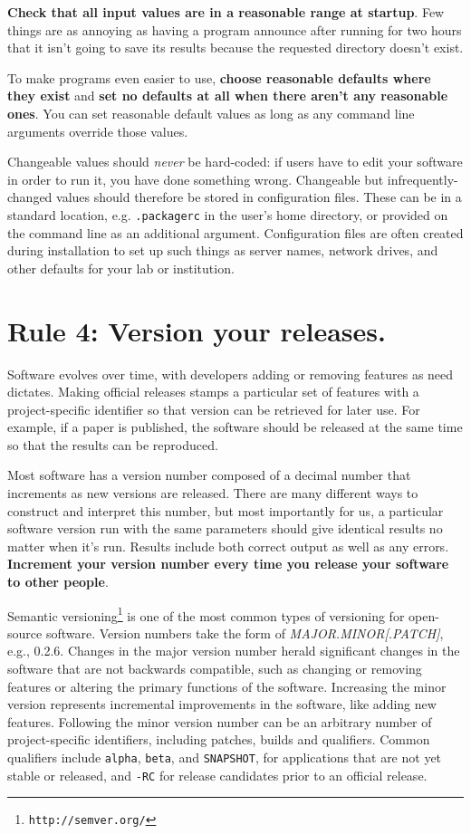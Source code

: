 \documentclass[10pt,letterpaper]{article}
\newcommand{\withurl}[2]{{#1}\footnote{\texttt{#2}}}
\newcommand{\rulemajor}[1]{\section{#1}}
\newcommand{\ruleminor}[1]{\textbf{#1}}
\begin{document}
\ruleminor{Check that all input values are in a reasonable range at startup}.
Few things are as annoying as having a program announce after running for two
hours that it isn't going to save its results because the requested directory
doesn't exist.

To make programs even easier to use,
\ruleminor{choose reasonable defaults where they exist}
and \ruleminor{set no defaults at all when there aren't any reasonable ones}.
You can set reasonable default values
as long as any command line arguments
override those values.

Changeable values should \emph{never} be hard-coded:
if users have to edit your software in order to run it,
you have done something wrong.
Changeable but infrequently-changed values should therefore be stored in configuration files.
These can be in a standard location,
e.g. \texttt{.packagerc} in the user's home directory,
or provided on the command line as an additional argument.
Configuration files are often created during installation
to set up such things as server names,
network drives,
and other defaults for your lab or institution.

\rulemajor{Rule 4: Version your releases.}

Software evolves over time, with developers adding or removing features as need
dictates. Making official releases stamps a particular set of features with a
project-specific identifier so that version can be retrieved for later use. For
example, if a paper is published, the software should be released at the same
time so that the results can be reproduced.

Most software has a version number composed of a decimal number that
increments as new versions are released.
There are many different ways
to construct and interpret this number, but most importantly for us, a
particular software version run with the same parameters should give
identical results no matter when it's run. Results include both correct
output as well as any errors.
\ruleminor{Increment your version number every time you release your software to
other people}.

\withurl{Semantic versioning}{http://semver.org/} is one of the most common
types of versioning for open-source software. Version numbers take the
form of \emph{MAJOR.MINOR{[}.PATCH{]}}, e.g., 0.2.6.
Changes in the major
version number herald significant changes in the software that are not
backwards compatible, such as changing or removing features or altering
the primary functions of the software. Increasing the minor version
represents incremental improvements in the software, like adding new
features. Following the minor version number can be an arbitrary number
of project-specific identifiers, including patches, builds and qualifiers.
Common qualifiers include \texttt{alpha}, \texttt{beta}, and \texttt{SNAPSHOT},
for applications that are
not yet stable or released, and \texttt{-RC} for release candidates prior
to an official release.
\end{document}
